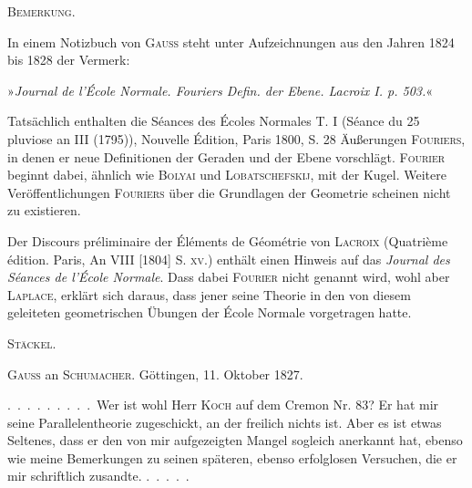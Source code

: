 \begin{center}
\textsc{Bemerkung.}
\end{center}

In einem Notizbuch von \textsc{Gauss} steht unter Aufzeichnungen aus den
Jahren 1824 bis 1828 der Vermerk:
\begin{center}»\emph{Journal de l'École Normale. Fouriers
Defin. der Ebene. Lacroix I. p. 503.}«\end{center}

Tatsächlich enthalten die Séances des Écoles Normales T. I (Séance du 25
pluviose an III (1795)), Nouvelle Édition, Paris 1800, S. 28 Äußerungen
\textsc{Fouriers}, in denen er neue Definitionen der Geraden und der Ebene
vorschlägt. \textsc{Fourier} beginnt dabei, ähnlich wie \textsc{Bolyai} und
\textsc{Lobatschefskij}, mit der Kugel. Weitere Veröffentlichungen
\textsc{Fouriers} über die Grundlagen der Geometrie scheinen nicht
zu existieren.

Der Discours préliminaire der Éléments de Géométrie von \textsc{Lacroix}
(Quatrième édition. Paris, An VIII [1804] S. \textsc{xv}.) enthält einen Hinweis auf
das \emph{Journal des Séances de l'École Normale}. Dass dabei
\textsc{Fourier} nicht genannt wird, wohl aber \textsc{Laplace}, erklärt sich
daraus, dass jener seine Theorie in den von diesem geleiteten geometrischen
Übungen der École Normale vorgetragen hatte.

\begin{flushright}
\textsc{Stäckel.}
\end{flushright}

\medskip

\begin{center}
\textsc{Gauss} an \textsc{Schumacher}. Göttingen, 11. Oktober 1827.
\end{center}

.\ .\ .\ .\ .\ .\ .\ .\ .\ Wer ist wohl Herr \textsc{Koch} auf dem Cremon Nr. 83? Er hat
mir seine Parallelentheorie zugeschickt, an der freilich nichts ist. Aber
es ist etwas Seltenes, dass er den von mir aufgezeigten Mangel sogleich anerkannt hat,
ebenso wie meine Bemerkungen zu seinen späteren, ebenso erfolglosen Versuchen, die er mir schriftlich
zusandte. .\ .\ .\ .\ .

